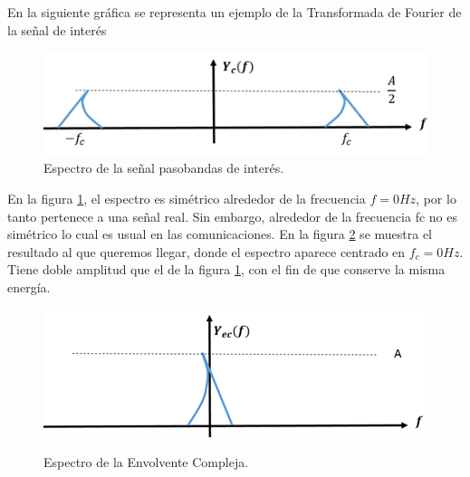 {\setlength{\parindent}{1pt} En la siguiente gráfica se representa un ejemplo de la Transformada de Fourier de la señal de interés }

\vspace{200px}
\begin{figure}[h!]
	\captionsetup{justification = raggedright, singlelinecheck = false}
	\caption{Espectro de la señal pasobandas de interés.} 
  	\label{fig:Espectro-bandapaso}
	\centering
	\includegraphics[trim = 0mm 0mm 0mm 0mm, clip,width=1\textwidth]{Imagenes/Espectro-bandapaso.png}
\end{figure}


{\setlength{\parindent}{1pt}En la figura \ref{fig:Espectro-bandapaso}, el espectro es simétrico alrededor de la frecuencia $f = 0 Hz$, por lo tanto pertenece a una señal real. Sin embargo, alrededor de la frecuencia fc no es simétrico lo cual es usual  en las comunicaciones. 
En la figura \ref{fig:Espectro} se muestra el resultado al que queremos llegar, donde el espectro aparece centrado en $f_{c}=0 Hz$. Tiene doble amplitud que el de la  figura \ref{fig:Espectro-bandapaso}, con el fin de que conserve la misma energía.} \\ 

\begin{figure}[h!]
	\captionsetup{justification = raggedright, singlelinecheck = false}
	\caption{Espectro de la Envolvente Compleja.} 
	\centering
	\includegraphics[scale=1.2]{Imagenes/Espectro-envolvente.png}
	\label{fig:Espectro}
\end{figure}

